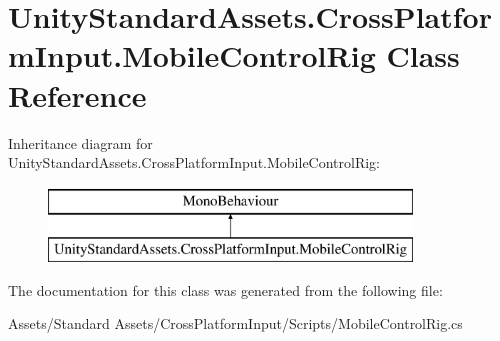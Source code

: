 \hypertarget{class_unity_standard_assets_1_1_cross_platform_input_1_1_mobile_control_rig}{}\section{Unity\+Standard\+Assets.\+Cross\+Platform\+Input.\+Mobile\+Control\+Rig Class Reference}
\label{class_unity_standard_assets_1_1_cross_platform_input_1_1_mobile_control_rig}
Inheritance diagram for Unity\+Standard\+Assets.\+Cross\+Platform\+Input.\+Mobile\+Control\+Rig\+:\begin{figure}[H]
\begin{center}
\leavevmode
\includegraphics[height=2.000000cm]{class_unity_standard_assets_1_1_cross_platform_input_1_1_mobile_control_rig}
\end{center}
\end{figure}


The documentation for this class was generated from the following file\+:\begin{DoxyCompactItemize}
\item 
Assets/\+Standard Assets/\+Cross\+Platform\+Input/\+Scripts/Mobile\+Control\+Rig.\+cs\end{DoxyCompactItemize}
